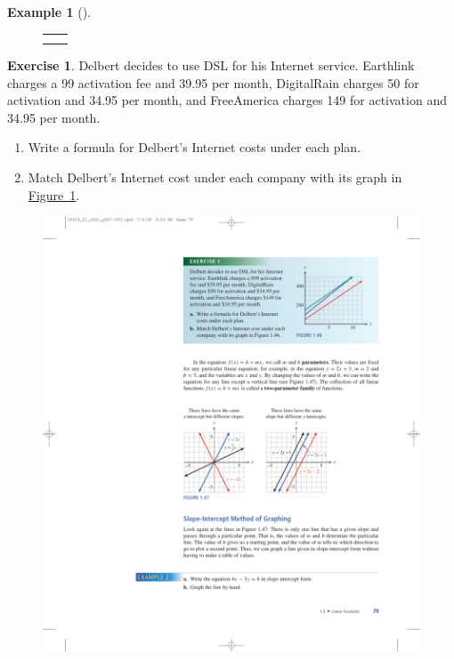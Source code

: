 \documentclass[10pt,]{book}
\theoremstyle{plain}
\theoremstyle{definition}
\theoremstyle{definition}
\newtheorem{example}[theorem]{Example}
\theoremstyle{definition}
\theoremstyle{definition}
\newtheorem{exercise}[theorem]{Exercise}
\numberwithin{equation}{part}
\newlength{\panelmax}
\begin{document}
\begin{example}[]
{{}
\newlength{\phGDimage}\setlength{\phGDimage}{\ht\panelboxGDimage+\dp\panelboxGDimage}
\settototalheight{\phGDimage}{\usebox{\panelboxGDimage}}
\setlength{\panelmax}{\maxof{\panelmax}{\phGDimage}}
\leavevmode%
\setlength{\tabcolsep}{0\textwidth}
\begin{figure}
\begin{tabular}{@{}*{2}{c}@{}}
\begin{minipage}[c][\panelmax][t]{0.5\textwidth}\usebox{\panelboxBNIp}\end{minipage}&
\begin{minipage}[c][\panelmax][t]{0.5\textwidth}\usebox{\panelboxGDimage}\end{minipage}\tabularnewline
&
\parbox[t]{0.5\textwidth}{
}\end{tabular}
\end{figure}
}%
\end{example}
\begin{exercise}\label{exercise-dsl-price}
Delbert decides to use DSL for his Internet service. Earthlink charges a \textdollar{}99 activation fee and \textdollar{}39.95 per month, DigitalRain charges \textdollar{}50 for activation and \textdollar{}34.95 per month, and FreeAmerica charges \textdollar{}149 for activation and \textdollar{}34.95 per month. \leavevmode%
\begin{enumerate}[label=*\alph**]
\item\hypertarget{li-1102}{}Write a formula for Delbert's Internet costs under each plan.%
\item\hypertarget{li-1103}{}Match Delbert's Internet cost under each company with its graph in \hyperref[fig-dsl-price]{Figure~\ref{fig-dsl-price}}.%
\end{enumerate}
 \begin{figure}
\centering
\includegraphics[width=0.6\linewidth]{images/fig-dsl-price}
\caption{\label{fig-dsl-price}}
\end{figure}
%
\end{exercise}
\end{document}
